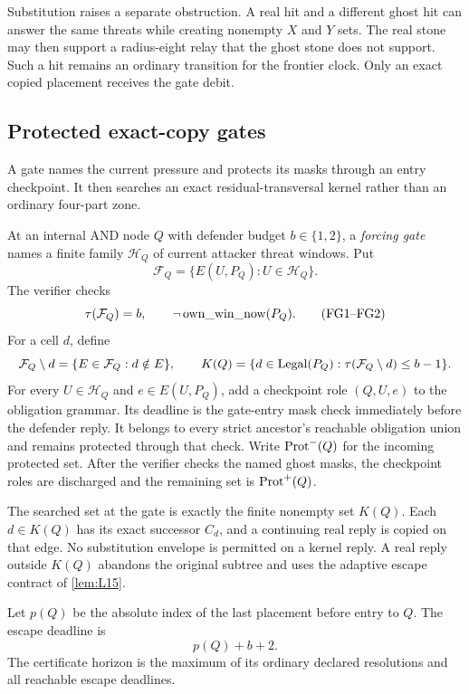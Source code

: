 Substitution raises a separate obstruction.  A real hit and a different
ghost hit can answer the same threats while creating nonempty $X$ and $Y$
sets.  The real stone may then support a radius-eight relay that the ghost
stone does not support.  Such a hit remains an ordinary transition for the
frontier clock.  Only an exact copied placement receives the gate debit.

\subsection{Protected exact-copy gates}

A gate names the current pressure and protects its masks through an entry
checkpoint.  It then searches an exact residual-transversal kernel rather
than an ordinary four-part zone.

\begin{definition}
\label{def:D19}
At an internal AND node $Q$ with defender budget $b\in\{1,2\}$, a
\emph{forcing gate} names a finite family $\mathcal H_Q$ of current attacker
threat windows.  Put
\[
\mathcal F_Q=\{E(U,P_Q):U\in\mathcal H_Q\}.
\]
The verifier checks
\[
\tau(\mathcal F_Q)=b,
\qquad \neg\operatorname{own\_win\_now}(P_Q).
\tag{FG1--FG2}
\]
For a cell $d$, define
\[
\mathcal F_Q\setminus d=\{E\in\mathcal F_Q:d\notin E\},
\qquad
K(Q)=\{d\in\operatorname{Legal}(P_Q):\tau(\mathcal F_Q\setminus d)\le b-1\}.
\]
For every $U\in\mathcal H_Q$ and $e\in E(U,P_Q)$, add a checkpoint role
$(Q,U,e)$ to the obligation grammar.  Its deadline is the gate-entry mask
check immediately before the defender reply.  It belongs to every strict
ancestor's reachable obligation union and remains protected through that
check.  Write $\operatorname{Prot}^-(Q)$ for the incoming protected set.  After the
verifier checks the named ghost masks, the checkpoint roles are discharged
and the remaining set is $\operatorname{Prot}^+(Q)$.

The searched set at the gate is exactly the finite nonempty set $K(Q)$.  Each
$d\in K(Q)$ has its exact successor $C_d$, and a continuing real reply is
copied on that edge.  No substitution envelope is permitted on a kernel
reply.  A real reply outside $K(Q)$ abandons the original subtree and uses
the adaptive escape contract of \cref{lem:L15}.

Let $p(Q)$ be the absolute index of the last placement before entry to $Q$.
The escape deadline is
\[
p(Q)+b+2.
\]
The certificate horizon is the maximum of its ordinary declared resolutions
and all reachable escape deadlines.
\end{definition}

